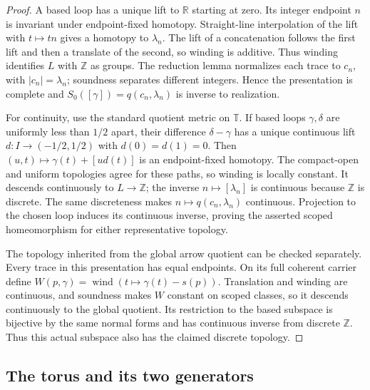 \documentclass[10pt,reqno]{amsart}
\theoremstyle{definition}
\theoremstyle{plain}
\theoremstyle{remark}
\newcommand{\Z}{\mathbb Z}
\begin{document}
\begin{proof}
A based loop has a unique lift to $\mathbb R$ starting at zero.
Its integer endpoint $n$ is invariant under endpoint-fixed homotopy.
Straight-line interpolation of the lift with $t\mapsto tn$ gives a
homotopy to $\lambda_n$. The lift of a concatenation follows the first
lift and then a translate of the second, so winding is additive.
Thus winding identifies $L$ with $\Z$ as groups. The reduction lemma
normalizes each trace to $c_n$, with $|c_n|=\lambda_n$; soundness separates
different integers. Hence the presentation is complete and
$S_0([\gamma])=q(c_n,\lambda_n)$ is inverse to realization.

For continuity, use the standard quotient metric on $\mathbb T$.
If based loops $\gamma,\delta$ are uniformly less than $1/2$ apart,
their difference $\delta-\gamma$ has a unique continuous lift
$d:I\to(-1/2,1/2)$ with $d(0)=d(1)=0$.
Then $(u,t)\mapsto\gamma(t)+[u d(t)]$ is an endpoint-fixed homotopy.
The compact-open and uniform topologies agree for these paths, so winding
is locally constant. It descends continuously to $L\to\Z$; the inverse
$n\mapsto[\lambda_n]$ is continuous because $\Z$ is discrete.
The same discreteness makes $n\mapsto q(c_n,\lambda_n)$ continuous.
Projection to the chosen loop induces its continuous inverse, proving
the asserted scoped homeomorphism for either representative topology.

The topology inherited from the global arrow quotient can be checked
separately. Every trace in this presentation has equal endpoints.
On its full coherent carrier define
$W(p,\gamma)=\operatorname{wind}(t\mapsto\gamma(t)-s(p))$.
Translation and winding are continuous, and soundness makes $W$
constant on scoped classes, so it descends continuously to the global
quotient. Its restriction to the based subspace is bijective by the
same normal forms and has continuous inverse from discrete $\Z$.
Thus this actual subspace also has the claimed discrete topology.
\end{proof}



\subsection{The torus and its two generators}
\end{document}
